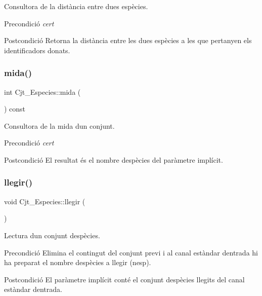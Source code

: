 Consultora de la distància entre dues espècies. 

\begin{DoxyPrecond}{Precondició}
{\itshape cert} 
\end{DoxyPrecond}
\begin{DoxyPostcond}{Postcondició}
Retorna la distància entre les dues espècies a les que pertanyen els identificadors donats. 
\end{DoxyPostcond}
\mbox{\label{class_cjt___especies_a6225eee3bd4dab0919a59633001e646b}} 
\subsubsection{\texorpdfstring{mida()}{mida()}}
{\footnotesize\ttfamily int Cjt\+\_\+\+Especies\+::mida (\begin{DoxyParamCaption}{ }\end{DoxyParamCaption}) const}



Consultora de la mida d\textquotesingle{}un conjunt. 

\begin{DoxyPrecond}{Precondició}
{\itshape cert} 
\end{DoxyPrecond}
\begin{DoxyPostcond}{Postcondició}
El resultat és el nombre d\textquotesingle{}espècies del paràmetre implícit. 
\end{DoxyPostcond}
\mbox{\label{class_cjt___especies_a2a0658d5acd67177881acc6f621fe2c0}} 
\subsubsection{\texorpdfstring{llegir()}{llegir()}}
{\footnotesize\ttfamily void Cjt\+\_\+\+Especies\+::llegir (\begin{DoxyParamCaption}{ }\end{DoxyParamCaption})}



Lectura d\textquotesingle{}un conjunt d\textquotesingle{}espècies. 

\begin{DoxyPrecond}{Precondició}
Elimina el contingut del conjunt previ i al canal estàndar d\textquotesingle{}entrada hi ha preparat el nombre d\textquotesingle{}espècies a llegir (nesp). 
\end{DoxyPrecond}
\begin{DoxyPostcond}{Postcondició}
El paràmetre implícit conté el conjunt d\textquotesingle{}espècies llegits del canal estàndar d\textquotesingle{}entrada. 
\end{DoxyPostcond}
\mbox{\label{class_cjt___especies_a82287a84ed59508a7a4214b8bb4cbc27}} 
